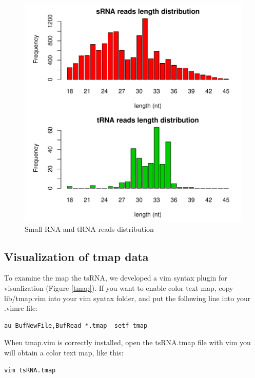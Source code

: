 \documentclass[11pt, a4paper]{article}
\begin{document}
\begin{figure}[htbp]
\begin{center}
\includegraphics[width=12cm]{distribution.pdf}
\caption{Small RNA and tRNA reads distribution}
\label{distribution}
\end{center}
\end{figure}

\subsection{Visualization of tmap data}

To examine the map the tsRNA, we developed a vim syntax plugin for visualization (Figure \ref{tmap}). If you want to enable color text map, copy lib/tmap.vim into your vim syntax folder, and put the following line into your .vimrc file:

\begin{verbatim}
au BufNewFile,BufRead *.tmap  setf tmap
\end{verbatim}

When tmap.vim is correctly installed, open the tsRNA.tmap file with vim you will obtain a color text map, like this:

\begin{verbatim}
vim tsRNA.tmap
\end{verbatim}
\end{document}
